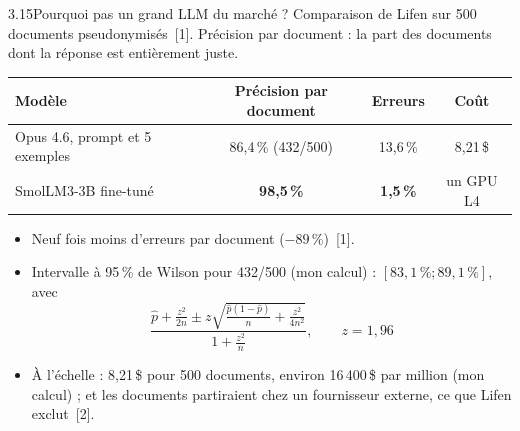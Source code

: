 \documentclass[11pt,aspectratio=169]{beamer}
\newcommand{\refs}[1]{{\color{mlblue}[#1]}}
\newcommand{\pct}[1]{#1\,\%}
\begin{document}
\begin{frame}{3.15\quad Pourquoi pas un grand LLM du marché ?}
  \small
  Comparaison de Lifen sur 500 documents pseudonymisés~\refs{1}. Précision par document : la
  part des documents dont la réponse est entièrement juste.

  \vspace{0.4em}
  \begin{center}
    \setlength{\tabcolsep}{5pt}
    \renewcommand{\arraystretch}{1.2}
    \begin{tabular}{@{}lccc@{}}
      \toprule
      \textbf{Modèle} & \textbf{Précision par document} & \textbf{Erreurs} & \textbf{Coût} \\
      \midrule
      Opus 4.6, prompt et 5 exemples & \pct{86,4} (432/500) & \pct{13,6} & 8,21\,\$ \\
      SmolLM3-3B fine-tuné & \textbf{\pct{98,5}} & \textbf{\pct{1,5}} & un GPU L4 \\
      \bottomrule
    \end{tabular}
  \end{center}

  \begin{itemize}
    \item Neuf fois moins d'erreurs par document ($-\pct{89}$)~\refs{1}.
    \item Intervalle à \pct{95} de Wilson pour 432/500 (mon calcul) :
      $\left[\pct{83,1} ; \pct{89,1}\right]$, avec
      \[
        \frac{\hat p + \frac{z^2}{2n} \pm z\sqrt{\frac{\hat p (1 - \hat p)}{n} + \frac{z^2}{4n^2}}}
             {1 + \frac{z^2}{n}}, \qquad z = 1{,}96
      \]
    \item À l'échelle : 8,21\,\$ pour 500 documents, environ 16\,400\,\$ par million (mon
      calcul) ; et les documents partiraient chez un fournisseur externe, ce que Lifen
      exclut~\refs{2}.
  \end{itemize}
\end{frame}
\end{document}
